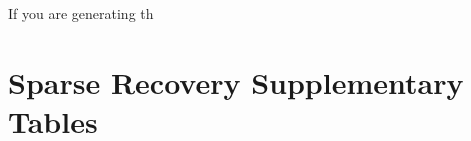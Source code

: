 \documentclass[pdflatex,sn-mathphys-num]{sn-jnl}%
\theoremstyle{thmstyleone}%
\theoremstyle{thmstyletwo}%
\theoremstyle{thmstylethree}%
\begin{document}
\begin{appendices}
If you are generating th

\section{Sparse Recovery Supplementary Tables}





\end{appendices}


\end{document}
